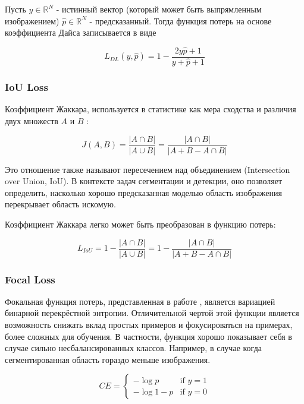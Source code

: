 Пусть $y \in \mathbb{R}^{N}$ - истинный вектор (который может быть выпрямленным изображением) $\hat{p} \in \mathbb{R}^{N}$ - предсказанный.
Тогда функция потерь на основе коэффициента Дайса записывается в виде

\begin{equation}
    L_{DL}(y, \hat{p} ) = 1 - \frac{2y\hat{p} + 1}{y + \hat{p} + 1}
\end{equation}


\subsubsection{IoU Loss}

Коэффициент Жаккара, используется в статистике как мера сходства и различия двух множеств $A$ и $B$ \cite{IoU-Loss}:

\begin{equation}
    J(A,B) = \frac{|A \cap B|}{|A \cup B|} = \frac{|A \cap B|}{|A + B - A \cap B|}
\end{equation}

Это отношение также называют пересечением над объединением
(Intersection over Union, IoU). В контексте задач сегментации и детекции,
оно позволяет определить, насколько  хорошо предсказанная моделью область изображения перекрывает
область искомую.

Коэффициент Жаккара легко может быть преобразован в функцию потерь\cite{IoU-Loss-2}:

\begin{equation}
    L_{IoU} = 1- \frac{|A \cap B|}{|A \cup B|} = 1 - \frac{|A \cap B|}{|A + B - A \cap B|}
\end{equation}

\subsubsection{Focal Loss}



Фокальная функция потерь, представленная в работе \cite{Focal-Loss}, является вариацией бинарной перекрёстной энтропии.
Отличительной чертой этой функции является возможность снижать вклад простых примеров и фокусироваться на примерах, более сложных
для обучения. В частности, функция хорошо показывает себя в случае сильно несбалансированных классов.
Например, в случае когда сегментированная область гораздо меньше изображения.


\begin{equation}
    CE=\begin{cases}
        -\log{p} & \text{if }y=1\\
        -\log{1-p} & \text{if }y=0
     \end{cases}
\end{equation}

